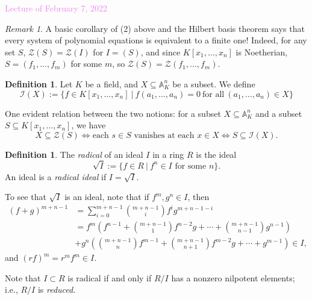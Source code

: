 \documentclass{amsart}[12pt]
\newcommand{\Feb}[1]{\textcolor{violet}{Lecture of February #1, 2022}}
\newcommand{\A}{\mathbb{A}}
\newcommand{\cZ}{\mathcal{Z}}
\newcommand{\cI}{\mathcal{I}}
\newcommand{\DEF}[1]{\emph{#1}\index{#1}}
\numberwithin{equation}{section}
\theoremstyle{plain} %
\theoremstyle{definition}
\newtheorem{defn}[equation]{Definition}
\newtheorem{definition}[equation]{Definition}
\theoremstyle{remark}
\newtheorem{rem}[equation]{Remark}
\begin{document}
\Feb{7}

\begin{rem}
A basic corollary of (2) above and the Hilbert basis theorem says that every system of polynomial equations is equivalent to a finite one! Indeed, for any set $S$, $\cZ(S) = \cZ(I)$ for $I=(S)$, and since $K[x_1,\dots,x_n]$ is Noetherian, $S=(f_1,\dots,f_m)$ for some $m$, so $\cZ(S) = \cZ(f_1,\dots,f_m)$.
\end{rem}


\begin{defn} Let $K$ be a field, and $X\subseteq \A^n_K$ be a subset. We define
\[\cI(X):= \{ f\in K[x_1,\dots,x_n] \ | \ f(a_1,\dots,a_n)=0 \ \textrm{for all} \ (a_1,\dots,a_n)\in X\}\]
\end{defn}

One evident relation between the two notions: for a subset $X\subseteq \A^n_K$ and a subset $S \subseteq K[x_1,\dots,x_n]$, we have 
\[ X \subseteq \cZ(S) \Longleftrightarrow \text{each $s\in S$ vanishes at each $x\in X$} \Longleftrightarrow S \subseteq \cI(X).\]

\begin{definition}
	The {\it radical} of an ideal $I$ in a ring $R$ is the ideal
	\[\sqrt{I} := \{f\in R \ | \ f^n\in I \textrm{ for some } n\}.\] 
	An ideal is a {\it radical ideal} if $I=\sqrt{I}$.
\end{definition}
 
 To see that $\sqrt{I}$ is an ideal, note that if $f^m, g^n \in I$, then 
 \[ \begin{aligned} (f+g)^{m+n-1} &= \sum_{i=0}^{m+n-1} \binom{m+n-1}{i} f^i g^{m+n-1-i} \\
 &= f^m \left(f^{n-1} + \binom{m+n-1}{1} f^{n-2}g + \cdots + \binom{m+n-1}{n-1} g^{n-1}\right) \\
 &+ g^n \left(\binom{m+n-1}{n} f^{m-1} + \binom{m+n-1}{n+1} f^{m-2} g + \cdots + g^{m-1} \right) \in I,
  \end{aligned}\]
 and $(rf)^m=r^m f^m \in I$.
 
Note that $I\subset R$ is radical if and only if $R/I$ has a nonzero nilpotent elements; i.e., $R/I$ is \DEF{reduced}.
\end{document}
